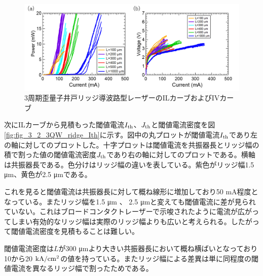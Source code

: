 {{\begin{figure}[h]
	\centering
	\includegraphics[width=15cm]{figure/fig_3_2_3QW_ridge_IL.png}
		\caption{3周期歪量子井戸リッジ導波路型レーザーのILカーブおよびIVカーブ}
		\label{fig:fig_3_2_3QW_ridge_IL}
\end{figure}


次にILカーブから見積もった閾値電流$I_{\rm{th}}$、$J_{\rm{th}}$と閾値電流密度を図\ref{fig:fig_3_2_3QW_ridge_Ith}に示す。図中の丸プロットが閾値電流$I_{\rm{th}}$であり左の軸に対してのプロットした。十字プロットは閾値電流を共振器長とリッジ幅の積で割った値の閾値電流密度$J_{\rm{th}}$であり右の軸に対してのプロットである。横軸は共振器長である。色分けはリッジ幅の違いを表している。紫色がリッジ幅1.5 \si{\micro\metre}、黄色が2.5 \si{\micro\metre}である。

これを見ると閾値電流は共振器長に対して概ね線形に増加しており50 mA程度となっている。またリッジ幅を1.5 \si{\micro\metre} 、 2.5 \si{\micro\metre}と変えても閾値電流に差が見られていない。これはブロードコンタクトレーザーで示唆されたように電流が広がってしまい有効的なリッジ幅は実際のリッジ幅よりも広いと考えられる。したがって閾値電流密度を見積もることは難しい。

閾値電流密度は$L$が300 \si{\micro\metre}より大きい共振器長において概ね横ばいとなっており10から20 $\rm{kA/cm^2}$の値を持っている。またリッジ幅による差異は単に同程度の閾値電流を異なるリッジ幅で割ったためである。


}}
